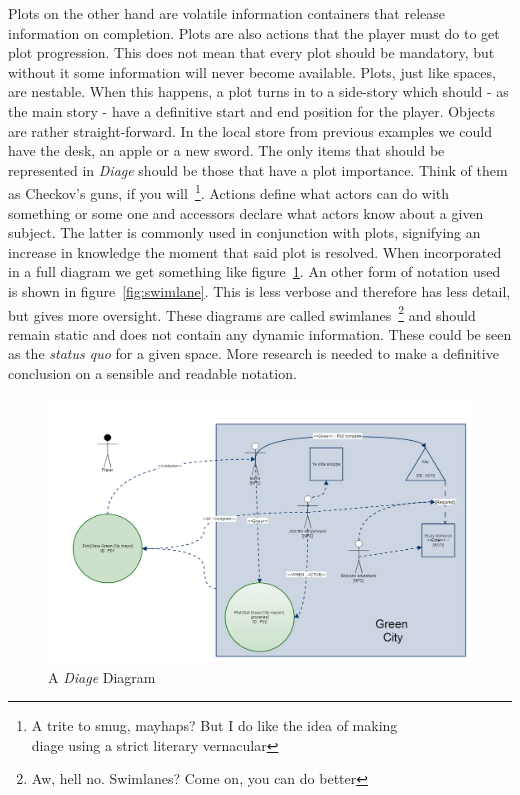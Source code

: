 \documentclass[11pt,a4paper,onecolumn,titlepage]{article}
\newcommand{\diage}{\textsl{Diage }}
\begin{document}
Plots on the other hand are volatile information containers that release information on completion. Plots are also actions that the player must do to get plot progression. This does not mean that every plot should be mandatory, but without it some information will never become available. Plots, just like spaces, are nestable. When this happens, a plot turns in to a side-story which should - as the main story - have a definitive start and end position for the player.
Objects are rather straight-forward. In the local store from previous examples we could have the desk, an apple or a new sword. The only items that should be represented in \diage should be those that have a plot importance. Think of them as Checkov's guns, if you will~\footnote{A trite to smug, mayhaps? But I do like the idea of making \\diage using a strict literary vernacular}.
Actions define what actors can do with something or some one and accessors declare what actors know about a given subject. The latter is commonly used in conjunction with plots, signifying an increase in knowledge the moment that said plot is resolved. When incorporated in a full diagram we get something like figure~\ref{fig:diagram1}. An other form of notation used is shown in figure~\ref{fig:swimlane}. This is less verbose and therefore has less detail, but gives more oversight. These diagrams are called swimlanes~\footnote{Aw, hell no. Swimlanes? Come on, you can do better} and should remain static and does not contain any dynamic information. These could be seen as the \textit{status quo} for a given space. More research is needed to make a definitive conclusion on a sensible and readable notation.
\begin{figure}
\label{fig:diagram1}
\includegraphics[scale=0.3]{diagram_example_1}
\caption{A \diage Diagram}
\end{figure}
\end{document}

